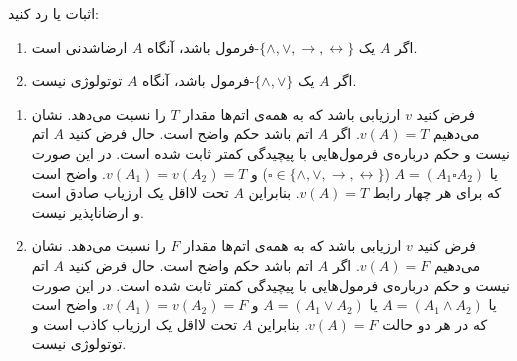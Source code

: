 اثبات یا رد کنید:

\begin{enumerate}
\item
اگر $A$ یک $\{\wedge,\vee,\rightarrow,\leftrightarrow\}$-فرمول باشد، آنگاه $A$ ارضاشدنی است.
\item
اگر $A$ یک $\{\wedge,\vee\}$-فرمول باشد، آنگاه $A$ توتولوژی نیست.
\end{enumerate}\quad\vspace{-9mm}
\begin{ans}
\begin{enumerate}
  \item
  فرض کنید $v$ ارزیابی باشد که به همه‌ی اتم‌ها مقدار $T$ را نسبت می‌دهد. نشان می‌دهیم $v(A)=T$. اگر $A$ اتم باشد حکم واضح است. حال فرض کنید $A$ اتم نیست و حکم درباره‌ی فرمول‌هایی با پیچیدگی کمتر ثابت شده است. در این صورت یا $A=(A_1\square A_2)$ ($\square\in\{\wedge,\vee,\rightarrow,\leftrightarrow\}$) و $v(A_1)=v(A_2)=T$. واضح است که برای هر چهار رابط $v(A)=T$. بنابراین $A$ تحت لااقل یک ارزیاب صادق است و ارضاناپذیر نیست.
  
  \item
  فرض کنید $v$ ارزیابی باشد که به همه‌ی اتم‌ها مقدار $F$ را نسبت می‌دهد. نشان می‌دهیم $v(A)=F$. اگر $A$ اتم باشد حکم واضح است. حال فرض کنید $A$ اتم نیست و حکم درباره‌ی فرمول‌هایی با پیچیدگی کمتر ثابت شده است. در این صورت یا $A=(A_1\wedge A_2)$ یا $A=(A_1\vee A_2)$ و $v(A_1)=v(A_2)=F$. واضح است که در هر دو حالت $v(A)=F$. بنابراین $A$ تحت لااقل یک ارزیاب کاذب است و توتولوژی نیست.
  
  \end{enumerate}
\end{ans}
